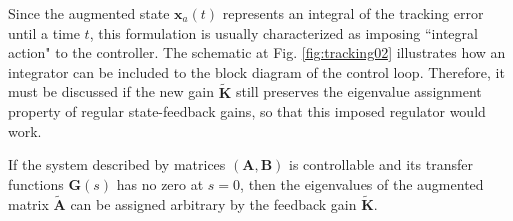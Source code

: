 \documentclass[a4paper,11pt]{book}
\numberwithin{figure}{chapter}
\numberwithin{equation}{chapter}
\numberwithin{table}{chapter}
\newtheorem{theorem}{Theorem}[chapter]
\theoremstyle{definition}
\newcounter{boxed-theorem}
\newenvironment{boxed-theorem}[1]
{\begin{shaded} \begin{theorem}{#1}}
{\end{theorem} \end{shaded}}
\newcounter{boxed-definition}
\begin{document}
Since the augmented state $\bm{x}_a(t)$ represents an integral of the tracking error until a time $t$, this formulation is usually characterized as imposing ``integral action" to the controller. The schematic at Fig. \ref{fig:tracking02} illustrates how an integrator can be included to the block diagram of the control loop. Therefore, it must be discussed if the new gain $\tilde{\bm{K}}$ still preserves the eigenvalue assignment property of regular state-feedback gains, so that this imposed regulator would work.

\begin{boxed-theorem}
	If the system described by matrices $(\bm{A}, \bm{B})$ is controllable and its transfer functions $\bm{G}(s)$ has no zero at $s = 0$, then the eigenvalues of the augmented matrix $\tilde{\bm{A}}$ can be assigned arbitrary by the feedback gain $\tilde{\bm{K}}$.
\end{boxed-theorem}
\end{document}
